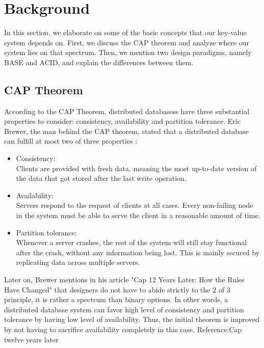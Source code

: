 \section{Background}
\label{sec:background}
In this section, we elaborate on some of the basic concepts that our key-value system depends on. First, we discuss the CAP theorem and analyze where our system lies on that spectrum. Then, we mention two design paradigms, namely BASE and ACID, and explain the differences between them.

\subsection{CAP Theorem}
\label{sec:background_cap}  %
According to the CAP Theorem, distributed databasess have three substantial properties to consider: consistency, availability and partition tolerance. Eric Brewer, the man behind the CAP theorem, stated that a distributed database can fulfill at most two of three properties \cite{brewer_cap}:

\begin{itemize}
  \item Consistency: \\
  Clients are provided with fresh data, meaning the most up-to-date version of the data that got stored after the last write operation.
  \item Availability: \\
  Servers respond to the request of clients at all cases. Every non-failing node in the system must be able to serve the client in a reasonable amount of time.
  \item Partition tolerance: \\
  Whenever a server crashes, the rest of the system will still stay functional after the crash, without any information being lost. This is mainly secured by replicating data across multiple servers.
\end{itemize}

Later on, Brewer mentions in his article "Cap 12 Years Later: How the Rules Have Changed" that designers do not have to abide strictly to the 2 of 3 principle, it is rather a spectrum than binary options. In other words, a distributed database system can favor high level of consistency and partition tolerance by having low level of availability. Thus, the initial theorem is improved by not having to sacrifice availability completely in this case. Reference:Cap twelve years later


